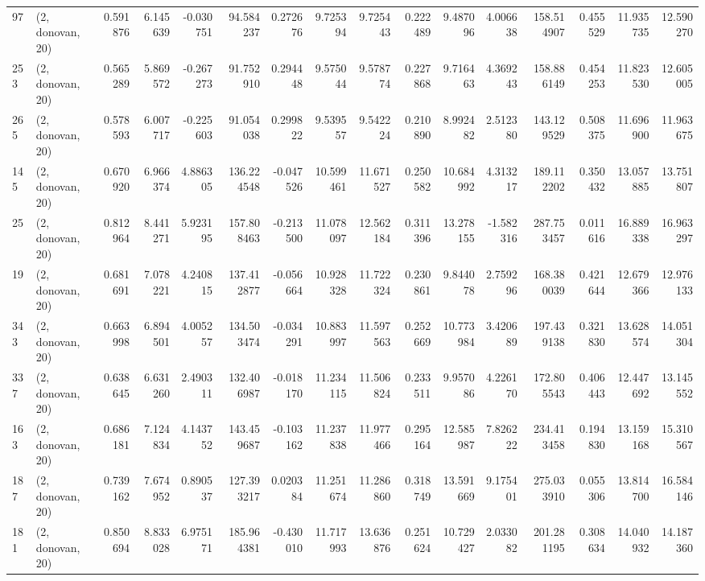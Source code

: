 \begin{tabular}{llrrrrrrrrrrrrrr}
97  &  (2, donovan, 20) &   0.591876 &   6.145639 &  -0.030751 &    94.584237 &   0.272676 &   9.725394 &   9.725443 &  0.222489 &   9.487096 &   4.006638 &   158.514907 &  0.455529 &  11.935735 &  12.590270 \\
253 &  (2, donovan, 20) &   0.565289 &   5.869572 &  -0.267273 &    91.752910 &   0.294448 &   9.575044 &   9.578774 &  0.227868 &   9.716463 &   4.369243 &   158.886149 &  0.454253 &  11.823530 &  12.605005 \\
265 &  (2, donovan, 20) &   0.578593 &   6.007717 &  -0.225603 &    91.054038 &   0.299822 &   9.539557 &   9.542224 &  0.210890 &   8.992482 &   2.512380 &   143.129529 &  0.508375 &  11.696900 &  11.963675 \\
145 &  (2, donovan, 20) &   0.670920 &   6.966374 &   4.886305 &   136.224548 &  -0.047526 &  10.599461 &  11.671527 &  0.250582 &  10.684992 &   4.313217 &   189.112202 &  0.350432 &  13.057885 &  13.751807 \\
25  &  (2, donovan, 20) &   0.812964 &   8.441271 &   5.923195 &   157.808463 &  -0.213500 &  11.078097 &  12.562184 &  0.311396 &  13.278155 &  -1.582316 &   287.753457 &  0.011616 &  16.889338 &  16.963297 \\
19  &  (2, donovan, 20) &   0.681691 &   7.078221 &   4.240815 &   137.412877 &  -0.056664 &  10.928328 &  11.722324 &  0.230861 &   9.844078 &   2.759296 &   168.380039 &  0.421644 &  12.679366 &  12.976133 \\
343 &  (2, donovan, 20) &   0.663998 &   6.894501 &   4.005257 &   134.503474 &  -0.034291 &  10.883997 &  11.597563 &  0.252669 &  10.773984 &   3.420689 &   197.439138 &  0.321830 &  13.628574 &  14.051304 \\
337 &  (2, donovan, 20) &   0.638645 &   6.631260 &   2.490311 &   132.406987 &  -0.018170 &  11.234115 &  11.506824 &  0.233511 &   9.957086 &   4.226170 &   172.805543 &  0.406443 &  12.447692 &  13.145552 \\
163 &  (2, donovan, 20) &   0.686181 &   7.124834 &   4.143752 &   143.459687 &  -0.103162 &  11.237838 &  11.977466 &  0.295164 &  12.585987 &   7.826222 &   234.413458 &  0.194830 &  13.159168 &  15.310567 \\
187 &  (2, donovan, 20) &   0.739162 &   7.674952 &   0.890537 &   127.393217 &   0.020384 &  11.251674 &  11.286860 &  0.318749 &  13.591669 &   9.175401 &   275.033910 &  0.055306 &  13.814700 &  16.584146 \\
181 &  (2, donovan, 20) &   0.850694 &   8.833028 &   6.975171 &   185.964381 &  -0.430010 &  11.717993 &  13.636876 &  0.251624 &  10.729427 &   2.033082 &   201.281195 &  0.308634 &  14.040932 &  14.187360 \\

\end{tabular}
